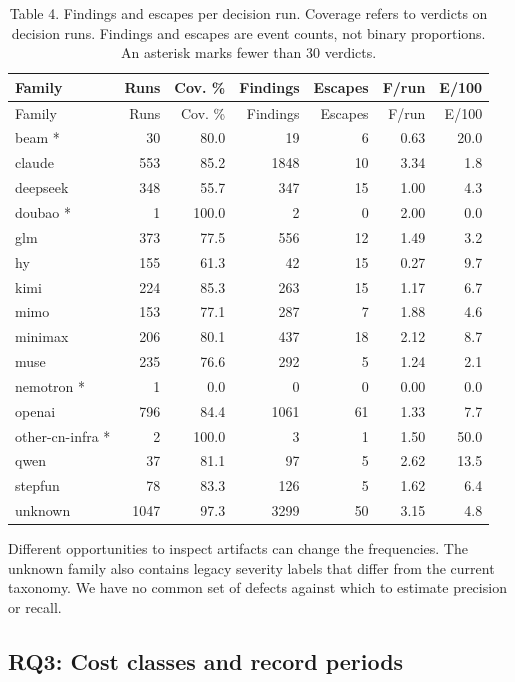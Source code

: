 \documentclass[
  10pt,
  a4paper,
]{article}
\begin{document}
\begin{longtable}[]{@{}lrrrrrr@{}}
\caption{Table 4. Findings and escapes per decision run. Coverage refers
to verdicts on decision runs. Findings and escapes are event counts, not
binary proportions. An asterisk marks fewer than 30
verdicts.}\tabularnewline
\toprule\noalign{}
Family & Runs & Cov. \% & Findings & Escapes & F/run & E/100 \\
\midrule\noalign{}
\endfirsthead
\toprule\noalign{}
Family & Runs & Cov. \% & Findings & Escapes & F/run & E/100 \\
\midrule\noalign{}
\endhead
\bottomrule\noalign{}
\endlastfoot
beam * & 30 & 80.0 & 19 & 6 & 0.63 & 20.0 \\
claude & 553 & 85.2 & 1848 & 10 & 3.34 & 1.8 \\
deepseek & 348 & 55.7 & 347 & 15 & 1.00 & 4.3 \\
doubao * & 1 & 100.0 & 2 & 0 & 2.00 & 0.0 \\
glm & 373 & 77.5 & 556 & 12 & 1.49 & 3.2 \\
hy & 155 & 61.3 & 42 & 15 & 0.27 & 9.7 \\
kimi & 224 & 85.3 & 263 & 15 & 1.17 & 6.7 \\
mimo & 153 & 77.1 & 287 & 7 & 1.88 & 4.6 \\
minimax & 206 & 80.1 & 437 & 18 & 2.12 & 8.7 \\
muse & 235 & 76.6 & 292 & 5 & 1.24 & 2.1 \\
nemotron * & 1 & 0.0 & 0 & 0 & 0.00 & 0.0 \\
openai & 796 & 84.4 & 1061 & 61 & 1.33 & 7.7 \\
other-cn-infra * & 2 & 100.0 & 3 & 1 & 1.50 & 50.0 \\
qwen & 37 & 81.1 & 97 & 5 & 2.62 & 13.5 \\
stepfun & 78 & 83.3 & 126 & 5 & 1.62 & 6.4 \\
unknown & 1047 & 97.3 & 3299 & 50 & 3.15 & 4.8 \\
\end{longtable}

Different opportunities to inspect artifacts can change the frequencies.
The unknown family also contains legacy severity labels that differ from
the current taxonomy. We have no common set of defects against which to
estimate precision or recall.

\subsection{RQ3: Cost classes and record
periods}\label{rq3-cost-classes-and-record-periods}
\end{document}
